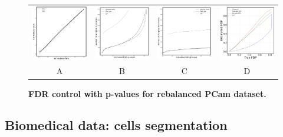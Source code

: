 \documentclass{article}
\begin{document}
\begin{figure}
	\advance\leftskip-0.5cm
	\begin{tabular}{cccc}
 		\includegraphics[width=1.7in]{img/pcam_balanced_QQ.png} &
		\includegraphics[width=1.7in]{img/pcam_balanced_fdr_control.png} & 
            \includegraphics[width=1.7in]{img/pcam_balanced_fdr_control_loc.png} &
            \includegraphics[width=1.7in]{img/cnn_FDPscat_pcam_balanced.png}
		\\	
		A & B & C & D
	\end{tabular}
	\caption{\bf FDR control with p-values for rebalanced PCam dataset.}
	\label{fig:pcam_rebalance}
\end{figure} 

\subsection{Biomedical data: cells segmentation}
\end{document}
